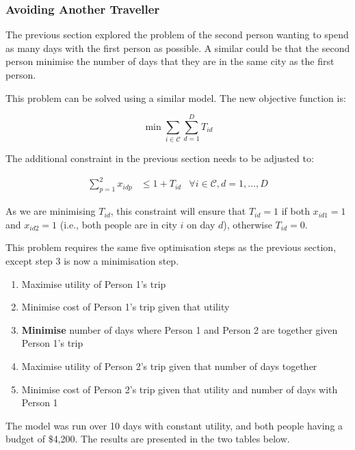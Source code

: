 \documentclass[12pt]{article}
\begin{document}
\subsubsection{Avoiding Another Traveller}

The previous section explored the problem of the second person wanting to spend as many days with the first person as possible. A similar could be that the second person minimise the number of days that they are in the same city as the first person.

This problem can be solved using a similar model. The new objective function is:

\begin{equation*}
	\min \sum_{i \in \mathcal{C}} \sum_{d = 1}^{D} T_{id}
\end{equation*}

The additional constraint in the previous section needs to be adjusted to:

\begin{align}
	\sum_{p = 1}^{2} x_{idp} & \leq 1 + T_{id} & \forall i \in \mathcal{C}, d = 1, \ldots, D
\end{align}

As we are minimising $T_{id}$, this constraint will ensure that $T_{id} = 1$ if both $x_{id1} = 1$ and $x_{id2} = 1$ (i.e., both people are in city $i$ on day $d$), otherwise $T_{id} = 0$.

This problem requires the same five optimisation steps as the previous section, except step 3 is now a minimisation step.

\begin{enumerate}
	\item Maximise utility of Person 1's trip
	\item Minimise cost of Person 1's trip given that utility
	\item \textbf{Minimise} number of days where Person 1 and Person 2 are together given Person 1's trip
	\item Maximise utility of Person 2's trip given that number of days together
	\item Minimise cost of Person 2's trip given that utility and number of days with Person 1
\end{enumerate}

The model was run over 10 days with constant utility, and both people having a budget of $\$$4,200. The results are presented in the two tables below.
\end{document}
